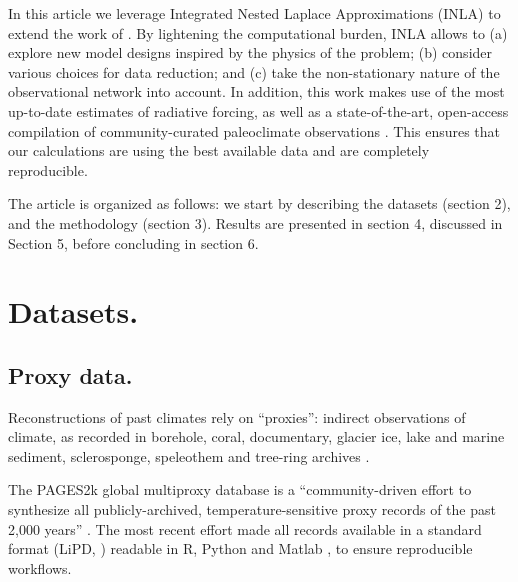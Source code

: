 \documentclass[12pt]{amsart}
\theoremstyle{plain}
\theoremstyle{definition}
\theoremstyle{remark}
\begin{document}
In this article we leverage Integrated Nested Laplace
Approximations (INLA) to extend the work of \cite{Barboza2014}. By lightening the computational burden, INLA allows to (a) explore new model designs inspired by the physics of the problem; (b) consider various choices for data reduction; and (c) take the non-stationary nature of the observational network into account.  In addition, this work makes use of the most up-to-date estimates of radiative forcing, as well as a state-of-the-art, open-access compilation of community-curated paleoclimate observations \citep{PAGES2kSD2017allauthors}. This ensures that our calculations are using the best available data and are completely
reproducible.  

The article is organized as follows: we start by describing the datasets (section 2), and the methodology (section 3). Results are presented in section 4, discussed in Section 5, before concluding in section 6. 

\section{Datasets.}
\label{sec:data}

\subsection{Proxy data.}
Reconstructions of past climates rely on ``proxies'': indirect observations of climate, as recorded in borehole, coral, documentary, glacier
ice, lake and marine sediment, sclerosponge, speleothem and tree-ring archives \citep{Jones_Holocene09}.

The PAGES2k global multiproxy database is a ``community-driven effort to
synthesize all publicly-archived, temperature-sensitive proxy records of the
past 2,000 years'' \citep{PAGES2KConsortium2013,Kaufman2014,PAGES2kSD2017allauthors}. The most recent effort \citep{PAGES2kSD2017allauthors} made all records available in a standard format (LiPD, \cite{lipd_cp}) readable in R, Python and Matlab \citep{lipd-util}, to ensure reproducible workflows.   
\end{document}
